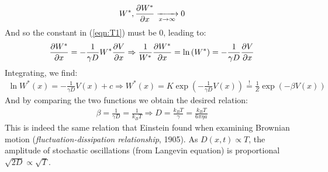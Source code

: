 \documentclass[../template.tex]{subfiles}
\begin{document}
\begin{align*}
    W^*, \pdv{W^*}{x} \xrightarrow[x \to \infty]{}  0
\end{align*} 
And so the constant in (\ref{eqn:T1}) must be $0$, leading to:
\begin{align*}
    \pdv{W^*}{x} = - \frac{1}{\gamma D} W^* \pdv{V}{x} \Rightarrow \frac{1}{W^*} \pdv{W^*}{x} = \ln\left(W^*\right) = -\frac{1}{\gamma D} \pdv{V}{x}   
\end{align*}
Integrating, we find:
\begin{align*}
    \ln W^*(x) = - \frac{1}{\gamma D} V(x) + c \Rightarrow W^*(x) = K \exp\left(-\frac{1}{\gamma D} V(x) \right) \overset{!}{=}  \frac{1}{Z} \exp\left(-\beta V(x)\right)  
\end{align*}
And by comparing the two functions we obtain the desired relation:
\begin{align*}
    \beta = \frac{1}{\gamma D} = \frac{1}{k_B T} \Rightarrow D = \frac{k_B T}{\gamma} = \frac{k_B T}{6 \pi \eta a}    
\end{align*}
This is indeed the same relation that Einstein found when examining Brownian motion (\textit{fluctuation-dissipation relationship}, 1905). As $D(x,t) \propto T$, the amplitude of stochastic oscillations (from Langevin equation) is proportional $\sqrt{2D} \propto \sqrt{T}$.

\end{document}
